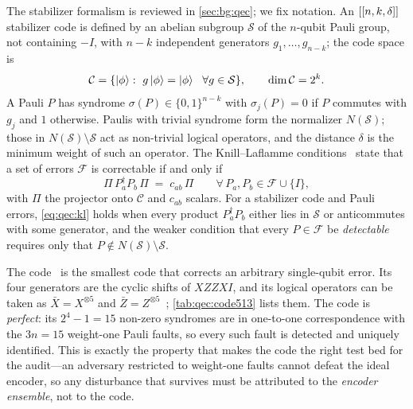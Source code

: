 The stabilizer formalism is reviewed in \cref{sec:bg:qec}; we fix notation. An $[[n,k,\delta]]$ stabilizer code is defined by an abelian subgroup $\mathcal{S}$ of the $n$-qubit Pauli group, not containing $-I$, with $n-k$ independent generators $g_1,\dots,g_{n-k}$; the code space is
\begin{equation}\label{eq:qec:codespace}
  \mathcal{C}=\{\ket{\phi}:\ g\ket{\phi}=\ket{\phi}\ \ \forall g\in\mathcal{S}\},\qquad \dim\mathcal{C}=2^{k}.
\end{equation}
A Pauli $P$ has syndrome $\sigma(P)\in\{0,1\}^{n-k}$ with $\sigma_j(P)=0$ if $P$ commutes with $g_j$ and $1$ otherwise. Paulis with trivial syndrome form the normalizer $N(\mathcal{S})$; those in $N(\mathcal{S})\setminus\mathcal{S}$ act as non-trivial logical operators, and the distance $\delta$ is the minimum weight of such an operator. The Knill--Laflamme conditions~\cite{knill1997theory} state that a set of errors $\mathcal{F}$ is correctable if and only if
\begin{equation}\label{eq:qec:kl}
  \Pi\,P_a^{\dagger}P_b\,\Pi \;=\; c_{ab}\,\Pi\qquad\forall\,P_a,P_b\in\mathcal{F}\cup\{I\},
\end{equation}
with $\Pi$ the projector onto $\mathcal{C}$ and $c_{ab}$ scalars. For a stabilizer code and Pauli errors, \cref{eq:qec:kl} holds when every product $P_a^{\dagger}P_b$ either lies in $\mathcal{S}$ or anticommutes with some generator, and the weaker condition that every $P\in\mathcal{F}$ be \emph{detectable} requires only that $P\notin N(\mathcal{S})\setminus\mathcal{S}$.

The  code~\cite{laflamme1996perfect,bennett1996mixed} is the smallest code that corrects an arbitrary single-qubit error. Its four generators are the cyclic shifts of $XZZXI$, and its logical operators can be taken as $\bar X=X^{\otimes 5}$ and $\bar Z=Z^{\otimes 5}$~\cite{nielsen2010qcqi}; \cref{tab:qec:code513} lists them. The code is \emph{perfect}: its $2^{4}-1=15$ non-zero syndromes are in one-to-one correspondence with the $3n=15$ weight-one Pauli faults, so every such fault is detected and uniquely identified. This is exactly the property that makes the code the right test bed for the audit---an adversary restricted to weight-one faults cannot defeat the ideal  encoder, so any disturbance that survives must be attributed to the \emph{encoder ensemble}, not to the code.

